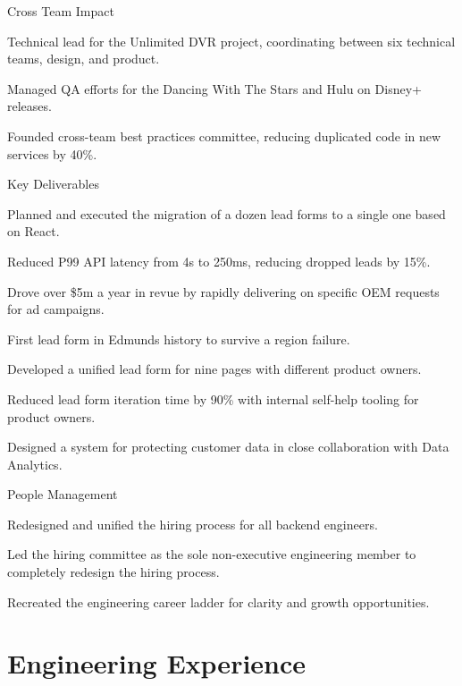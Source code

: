 \documentclass[]{deedy-resume-openfont}
\begin{document}
Cross Team Impact
\begin{tightemize}
  \item Technical lead for the Unlimited DVR project, coordinating between six technical teams, design, and product.
  \item Managed QA efforts for the Dancing With The Stars and Hulu on Disney+ releases.
  \item Founded cross-team best practices committee, reducing duplicated code in new services by 40\%.
\end{tightemize}
\sectionsep

\vspace{\topsep}
Key Deliverables
\begin{tightemize}
\item Planned and executed the migration of a dozen lead forms to a single one based on React.
\item Reduced P99 API latency from 4s to 250ms, reducing dropped leads by 15\%.
\item Drove over \$5m a year in revue by rapidly delivering on specific OEM requests for ad campaigns.
\item First lead form in Edmunds history to survive a region failure.
\item Developed a unified lead form for nine pages with different product owners.
\item Reduced lead form iteration time by 90\% with internal self-help tooling for product owners.
\item Designed a system for protecting customer data in close collaboration with Data Analytics.
\end{tightemize}
\sectionsep
People Management
\begin{tightemize}
  \item Redesigned and unified the hiring process for all backend engineers.
  \item Led the hiring committee as the sole non-executive engineering member to completely redesign the hiring process.
  \item Recreated the engineering career ladder for clarity and growth opportunities.
\end{tightemize}


\section{Engineering Experience}
\end{document}

